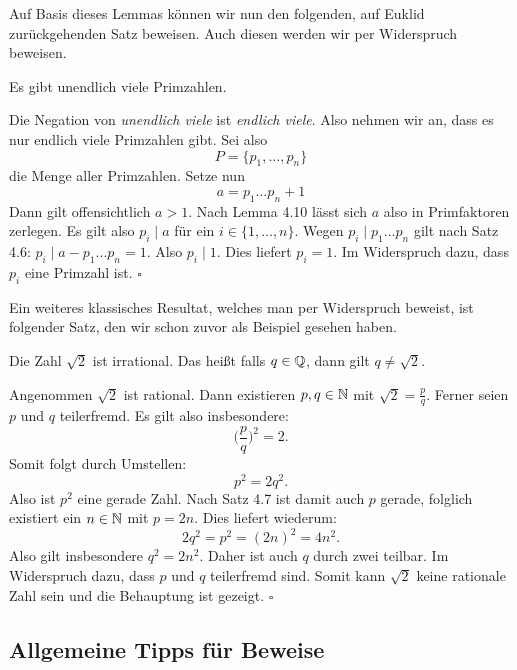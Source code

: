 \vspace*{3em}
Auf Basis dieses Lemmas können wir nun den folgenden, auf Euklid
zurückgehenden Satz beweisen.
Auch diesen werden wir per Widerspruch beweisen.


\begin{theorem}
Es gibt unendlich viele Primzahlen.
\end{theorem}

\begin{proof*}
Die Negation von \textit{unendlich viele} ist \textit{endlich viele}.
Also nehmen wir an, dass es nur endlich viele Primzahlen gibt.
Sei also
\[
  P = \{p_1,\ldots,p_n\}
\]
die Menge aller Primzahlen.
Setze nun
\[
  a = p_1 \ldots p_n + 1
\]
Dann gilt offensichtlich $a>1$.
Nach Lemma 4.10 lässt sich $a$ also in Primfaktoren zerlegen.
Es gilt also $p_i \mid a$ für ein $i \in \{1,\ldots,n\}$.
Wegen $p_i \mid p_1 ... p_n$ gilt nach Satz 4.6:
$p_i \mid a - p_1 ... p_n = 1$.
Also $p_i \mid 1$.
Dies liefert $p_i = 1$.
Im Widerspruch dazu, dass $p_i$ eine Primzahl ist.
\hfill $\square$
\end{proof*}


\vspace*{3em}
Ein weiteres klassisches Resultat, welches man per Widerspruch beweist, ist
folgender Satz, den wir schon zuvor als Beispiel gesehen haben.


\begin{theorem}
Die Zahl $\sqrt{2}$ ist irrational.
Das heißt falls $q \in \mathbb{Q}$, dann gilt $q \neq \sqrt{2}$.
\end{theorem}

\begin{proof*}
Angenommen $\sqrt{2}$ ist rational.
Dann existieren $p,q \in \mathbb{N}$ mit $\sqrt{2} = \frac{p}{q}$.
Ferner seien $p$ und $q$ teilerfremd.
Es gilt also insbesondere:
\[
  \big(\frac{p}{q}\big)^2 = 2 .
\]
Somit folgt durch Umstellen:
\[
  p^2 = 2q^2.
\]
Also ist $p^2$ eine gerade Zahl.
Nach Satz 4.7 ist damit auch $p$ gerade, folglich existiert ein $n \in \mathbb{N}$
mit $p = 2n$.
Dies liefert wiederum:
\[
  2q^2 = p^2 = (2n)^2 = 4n^2.
\]
Also gilt insbesondere $q^2 = 2n^2$.
Daher ist auch $q$ durch zwei teilbar.
Im Widerspruch dazu, dass $p$ und $q$ teilerfremd sind.
Somit kann $\sqrt{2}$ keine rationale Zahl sein und die Behauptung ist gezeigt.
\hfill $\square$
\end{proof*}


\subsection{Allgemeine Tipps für Beweise}

